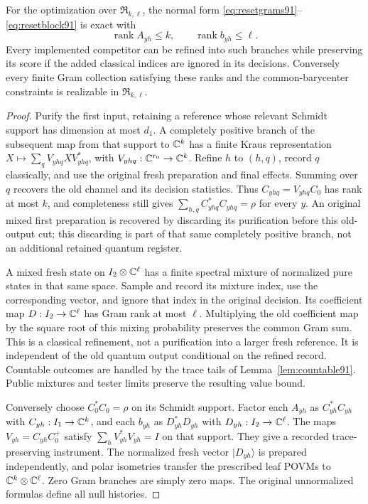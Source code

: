 \begin{lemma}\label{lem:ranknormal92}
For the optimization over $\mathfrak R_{k,\ell}$, the normal form
\eqref{eq:resetgrams91}--\eqref{eq:resetblock91} is exact with
\begin{equation}\label{eq:rankconstraints92}
 \operatorname{rank}A_{yh}\le k,\qquad
 \operatorname{rank}b_{yh}\le\ell.
\end{equation}
Every implemented competitor can be refined into such branches while
preserving its score if the added classical indices are ignored in
its decisions.  Conversely every finite Gram collection satisfying
these ranks and the common-barycenter constraints is realizable in
$\mathfrak R_{k,\ell}$.
\end{lemma}
\begin{proof}
Purify the first input, retaining a reference whose relevant Schmidt
support has dimension at most $d_1$.  A completely positive branch of
the subsequent map from that support to $\mathbb C^k$ has a finite Kraus
representation $X\mapsto\sum_qV_{yhq}XV_{yhq}^*$, with
$V_{yhq}:\mathbb C^{r_0}\to\mathbb C^k$.  Refine $h$ to $(h,q)$, record $q$
classically, and use the original fresh preparation and final effects.
Summing over $q$ recovers the old channel and its decision statistics.
Thus $C_{yhq}=V_{yhq}C_0$ has rank at most $k$, and completeness
still gives $\sum_{h,q}C_{yhq}^*C_{yhq}=\rho$ for every $y$.
An original mixed first preparation is recovered by discarding its
purification before this old-output cut; this discarding is part of
that same completely positive branch, not an additional retained
quantum register.

A mixed fresh state on $I_2\otimes\mathbb C^\ell$ has a finite spectral
mixture of normalized pure states in that same space.  Sample and
record its mixture index, use the corresponding vector, and ignore
that index in the original decision.  Its coefficient map
$D:I_2\to\mathbb C^\ell$ has Gram rank at most $\ell$.  Multiplying the
old coefficient map by the square root of this mixing probability
preserves the common Gram sum.  This is a classical refinement, not a
purification into a larger fresh reference.  It is independent of the
old quantum output conditional on the refined record.  Countable
outcomes are handled by the trace tails of Lemma~\ref{lem:countable91}.
Public mixtures and tester limits preserve the resulting value bound.

Conversely choose $C_0^*C_0=\rho$ on its Schmidt support.  Factor each
$A_{yh}$ as $C_{yh}^*C_{yh}$ with
$C_{yh}:I_1\to\mathbb C^k$, and each $b_{yh}$ as $D_{yh}^*D_{yh}$ with
$D_{yh}:I_2\to\mathbb C^\ell$.  The maps $V_{yh}=C_{yh}C_0^+$ satisfy
$\sum_hV_{yh}^*V_{yh}=I$ on that support.  They give a recorded
trace-preserving instrument.  The normalized fresh vector $|D_{yh}\rangle$
is prepared independently, and polar isometries transfer the prescribed
leaf POVMs to $\mathbb C^k\otimes\mathbb C^\ell$.  Zero Gram branches are simply
zero maps.  The original unnormalized formulas define all null histories.
\end{proof}

